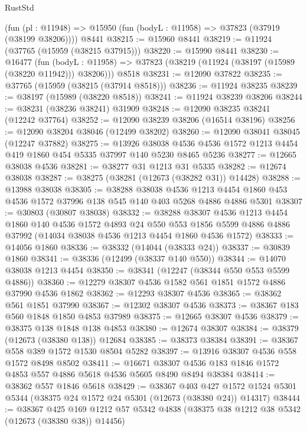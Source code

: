 \begin{lexlean}{RustStd}
\begin{coremodule}
{\begin{coremodule}
{{{{{{{{{{{{{{{{{{{{{{{{{{{{{{{{{{{{{{{{{{{{{{{{{{{{{{{{{{{{{{{{{{{{{{{{{{{{{{{{    (fun (pl : @11948) => @15950 (fun (bodyL : @11958) => @37823 (@37919 (@38199 @38206))))
    @8441
@38215 := @15960 @8441
@38219 := @11924 (@37765 (@15959 (@38215 @37915)))
@38220 := @15990 @8441
@38230 := @16477
    (fun (bodyL : @11958) => @37823 (@38219 (@11924 (@38197 (@15989 (@38220 @11942))) @38206)))
    @8518
@38231 := @12090 @37822
@38235 := @37765 (@15959 (@38215 (@37914 @8518)))
@38236 := @11924 @38235
@38239 := @38197 (@15989 (@38220 @8518))
@38241 := @11924 @38239 @38206
@38244 := @38231 (@38236 @38241) @31909
@38248 := @12090 @38235 @38241 (@12242 @37764)
@38252 := @12090 @38239 @38206 (@16514 @38196)
@38256 := @12090 @38204 @38046 (@12499 @38202)
@38260 := @12090 @38041 @38045 (@12247 @37882)
@38275 := @13926
    @38038
    @4536
    @4536
    @1572
    @1213
    @4454
    @419
    @1860
    @454
    @5335
    @37997
    @140
    @5230
    @8465
    @5236
@38277 := @12665 @38038 @4536
@38281 := @38277 @31 @1213 @31 @5335
@38282 := @12674 @38038
@38287 := @38275 (@38281 (@12673 (@38282 @31)) @14428)
@38288 := @13988 @38038
@38305 := @38288
    @38038
    @4536
    @1213
    @4454
    @1860
    @453
    @4536
    @1572
    @37996
    @138
    @545
    @140
    @403
    @5268
    @4886
    @4886
    @5301
@38307 := @30803 (@30807 @38038)
@38332 := @38288
    @38307
    @4536
    @1213
    @4454
    @1860
    @140
    @4536
    @1572
    @4893
    @24
    @550
    @553
    @1856
    @5599
    @4886
    @4886
    @37992
    (@14034 @38038 @4536 @1213 @4454 @1860 @4536 @1572)
@38333 := @14056 @1860
@38336 := @38332 (@14044 (@38333 @24))
@38337 := @30839 @1860
@38341 := @38336 (@12499 (@38337 @140 @550))
@38344 := @14070 @38038 @1213 @4454
@38350 := @38341 (@12247 (@38344 @550 @553 @5599 @4886))
@38360 := @12279 @38307 @4536 @1582 @561 @1851 @1572 @4886 @37990 @4536 @1862
@38362 := @12293 @38307 @4536
@38365 := @38362 @561 @1851 @37990
@38367 := @12302 @38307 @4536
@38373 := @38367 @183 @560 @1848 @1850 @4853 @37989
@38375 := @12665 @38307 @4536
@38379 := @38375 @138 @1848 @138 @4853
@38380 := @12674 @38307
@38384 := @38379 (@12673 (@38380 @138)) @12684
@38385 := @38373 @38384
@38391 := @38367 @558 @389 @1572 @1530 @8504 @5282
@38397 := @13916 @38307 @4536 @558 @1572 @8498 @8502
@38411 := @16671 @38307 @4536 @183 @1846 @1572 @4853 @557 @4886 @5618 @4536 @5605 @8490 @8494 @38384
@38414 := @38362 @557 @1846 @5618
@38429 := @38367
    @403
    @427
    @1572
    @1524
    @5301
    @5344
    (@38375 @24 @1572 @24 @5301 (@12673 (@38380 @24)) @14317)
@38444 := @38367
    @425
    @169
    @1212
    @57
    @5342
    @4838
    (@38375 @38 @1212 @38 @5342 (@12673 (@38380 @38)) @14456)
}}}}}}}}}}}}}}}}}}}}}}}}}}}}}}}}}}}}}}}}}}}}}}}}}}}}}}}}}}}}}}}}}}}}}}}}}}}}}}}}
\end{coremodule}}
\end{coremodule}
\end{lexlean}
